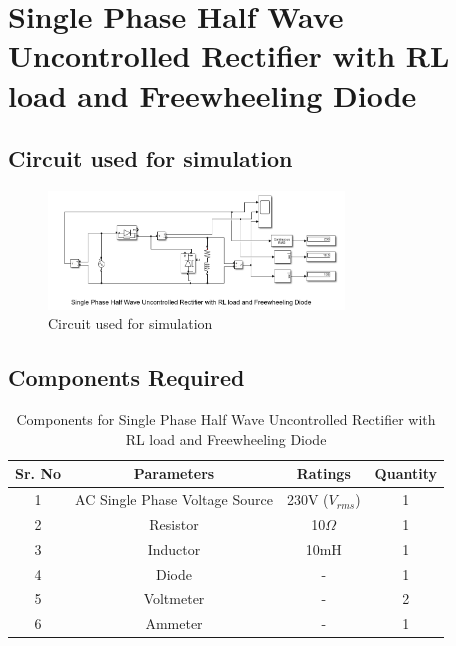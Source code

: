 \section{Single Phase Half Wave Uncontrolled Rectifier with RL load and Freewheeling Diode}

\subsection{Circuit used for simulation}

\begin{figure}[h]
    \centering
    \includegraphics[width=0.7\textwidth]{images/experiment-1/circuit-diagram-simulation-03.png}
    \caption{Circuit used for simulation}
    \label{Fig_simulation_circuit_single-phase-half-wave-uncontrolled-rectifier-with-RL-load-and-freewheeling-diode}
\end{figure}

\subsection{Components Required}

\begin{table}[h]
    \renewcommand{\arraystretch}{1.3}
    \caption{Components for Single Phase Half Wave Uncontrolled Rectifier with RL load and Freewheeling Diode}
    \label{table_components_required_circuit_3}
    \centering
    \begin{tabular}{|c|c|c|c|}
        \hline
        Sr. No & Parameters                     & Ratings            & Quantity \\
        \hline
        \hline
        1      & AC Single Phase Voltage Source & 230V ($ V_{rms} $) & 1        \\
        \hline
        2      & Resistor                       & 10$ \Omega $       & 1        \\
        \hline
        3      & Inductor                       & 10mH               & 1        \\
        \hline
        4      & Diode                          & -                  & 1        \\
        \hline
        5      & Voltmeter                      & -                  & 2        \\
        \hline
        6      & Ammeter                        & -                  & 1        \\
        \hline
    \end{tabular}
\end{table}


